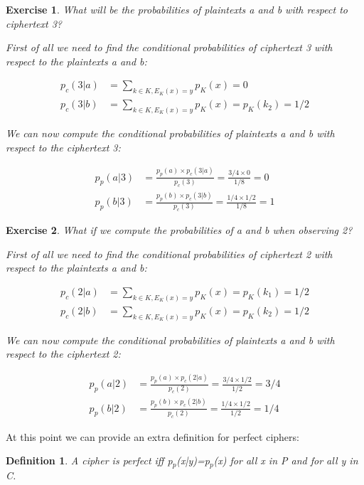 \documentclass[a4paper, 12pt]{report}
\newtheorem{definition}{\textbf{Definition}}
\newtheorem{exercise}{\textbf{Exercise}}
\begin{document}
\begin{exercise}
	What will be the probabilities of plaintexts a and b with respect to ciphertext 3?
	
	First of all we need to find the conditional probabilities of ciphertext 3 with respect to the plaintexts a and b:
	
	\setcounter{equation}{0}
	\begin{align}
		p_c(3|a) &= \sum_{k\in K, E_K(x)=y}^{} p_K(x) = 0 \\
		p_c(3|b) &= \sum_{k\in K, E_K(x)=y}^{} p_K(x) = p_K(k_2) = 1/2		
	\end{align}
	
	We can now compute the conditional probabilities of plaintexts a and b with respect to the ciphertext 3:
	
	\setcounter{equation}{0}
	\begin{align}
		p_p(a|3) &= \frac{p_p(a) \times p_c(3|a)}{p_c(3)} = \frac{3/4 \times 0}{1/8} = 0\\
		p_p(b|3) &= \frac{p_p(b) \times p_c(3|b)}{p_c(3)} = \frac{1/4 \times 1/2}{1/8} =  1
	\end{align}
\end{exercise}

\begin{exercise}
	What if we compute the probabilities of a and b when observing 2?
	
	First of all we need to find the conditional probabilities of ciphertext 2 with respect to the plaintexts a and b:
	
	\setcounter{equation}{0}
	\begin{align}
	p_c(2|a) &= \sum_{k\in K, E_K(x)=y}^{} p_K(x) = p_K(k_1) = 1/2 \\
	p_c(2|b) &= \sum_{k\in K, E_K(x)=y}^{} p_K(x) = p_K(k_2) = 1/2		
	\end{align}
	
	We can now compute the conditional probabilities of plaintexts a and b with respect to the ciphertext 2:
	
	\setcounter{equation}{0}
	\begin{align}
	p_p(a|2) &= \frac{p_p(a) \times p_c(2|a)}{p_c(2)} = \frac{3/4 \times 1/2}{1/2} = 3/4\\
	p_p(b|2) &= \frac{p_p(b) \times p_c(2|b)}{p_c(2)} = \frac{1/4 \times 1/2}{1/2} =  1/4
	\end{align}
\end{exercise}

At this point we can provide an extra definition for perfect ciphers:
\begin{definition}\label{defperfcipher}
	A cipher is perfect iff p$_p$(x|y)=p$_p$(x) for all x in P and for all y in C.
\end{definition}
\end{document}
